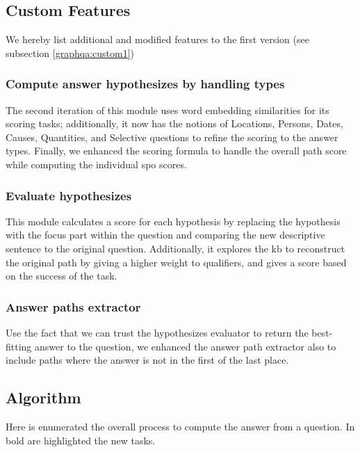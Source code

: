 \subsection{Custom Features}
We hereby list additional and modified features to the first version (see subsection \ref{graphqa:custom1})

\subsubsection{Compute answer hypothesizes by handling types}
The second iteration of this module uses word embedding similarities for its scoring tasks; additionally, it now has the notions of Locations, Persons, Dates, Causes, Quantities, and Selective questions to refine the scoring to the answer types. Finally, we enhanced the scoring formula to handle the overall path score while computing the individual \gls{spo} scores.

\subsubsection{Evaluate hypothesizes}
This module calculates a score for each hypothesis by replacing the hypothesis with the focus part within the question and comparing the new descriptive sentence to the original question. Additionally, it explores the \gls{kb} to reconstruct the original path by giving a higher weight to qualifiers, and gives a score based on the success of the task.

\subsubsection{Answer paths extractor}
Use the fact that we can trust the hypothesizes evaluator to return the best-fitting answer to the question, we enhanced the answer path extractor also to include paths where the answer is not in the first of the last place.

\subsection{Algorithm}
Here is enumerated the overall process to compute the answer from a question. In bold are highlighted the new tasks.

